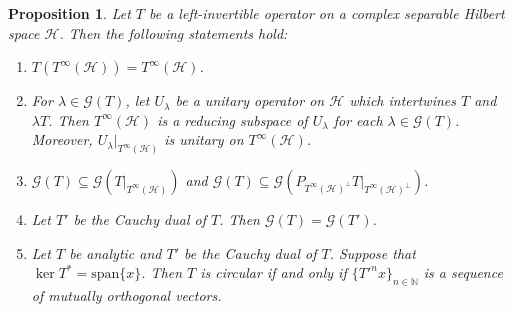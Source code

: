 \documentclass[10pt,a4paper]{amsart}
\newtheorem{proposition}[theorem]{Proposition}%
\begin{document}
\begin{proposition}\label{Tinfinity}
Let $T$ be a left-invertible operator on a complex separable Hilbert space $\mathcal H$. Then the following statements hold:
\begin{enumerate}
\item[(i)] $T(T^\infty(\mathcal H)) = T^\infty(\mathcal H)$.
\item[(ii)] For $\lambda \in \mathcal G(T)$, let $U_\lambda$ be a unitary operator on $\mathcal H$ which intertwines $T$ and $\lambda T$. Then $T^\infty(\mathcal H)$ is a reducing subspace of $U_\lambda$ for each $\lambda \in \mathcal G(T)$. Moreover, $U_\lambda|_{T^\infty(\mathcal H)}$ is unitary on $T^\infty(\mathcal H)$.
\item[(iii)] $\mathcal G(T) \subseteq \mathcal G(T|_{T^\infty(\mathcal H)})$ and $\mathcal G(T) \subseteq \mathcal G(P_{T^\infty(\mathcal H)^\bot}T|_{T^\infty(\mathcal H)^\bot})$.
\item[(iv)] Let $T'$ be the Cauchy dual of $T$. Then $\mathcal G(T) = \mathcal G(T')$.
\item[(v)] Let $T$ be analytic and $T'$ be the Cauchy dual of $T$. Suppose that $\ker T^* = \text{span}\{x\}$. Then $T$ is circular if and only if $\{T'^n x\}_{n \in \mathbb N}$ is a sequence of mutually orthogonal vectors.
\end{enumerate}
\end{proposition}
\end{document}
